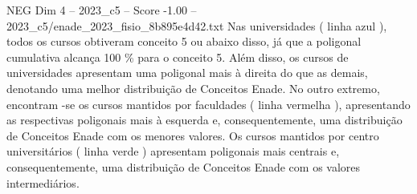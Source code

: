 \begin{textsample}{NEG Dim 4 – 2023\_c5 – Score -1.00 – 2023\_c5/enade\_2023\_fisio\_8b895e4d42.txt}
Nas universidades ( linha azul ), todos os cursos obtiveram conceito 5 ou abaixo disso, já que a poligonal cumulativa alcança 100 \% para o conceito 5.
Além disso, os cursos de universidades apresentam uma poligonal mais à direita do que as demais, denotando uma melhor distribuição de Conceitos Enade.
No outro extremo, encontram -se os cursos mantidos por faculdades ( linha vermelha ), apresentando as respectivas poligonais mais à esquerda e, consequentemente, uma distribuição de Conceitos Enade com os menores valores.
Os cursos mantidos por centro universitários ( linha verde ) apresentam poligonais mais centrais e, consequentemente, uma distribuição de Conceitos Enade com os valores intermediários.

\end{textsample}

